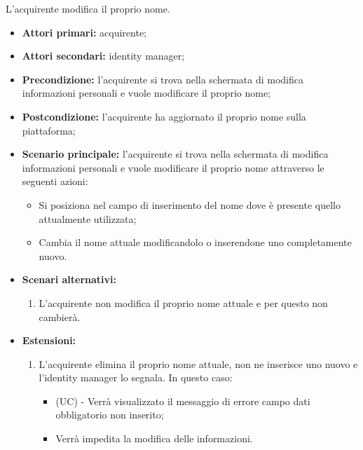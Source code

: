 L'acquirente modifica il proprio nome.
\begin{itemize}
    \item \textbf{Attori primari:} acquirente;
    \item \textbf{Attori secondari:} identity manager;
    \item \textbf{Precondizione:} l'acquirente si trova nella schermata di modifica informazioni personali e vuole modificare il proprio nome;
    \item \textbf{Postcondizione:} l'acquirente ha aggiornato il proprio nome sulla piattaforma;
    \item \textbf{Scenario principale:} l'acquirente si trova nella schermata di modifica informazioni personali e vuole modificare il proprio nome attraverso le seguenti azioni:
        \begin{itemize}
            \item Si posiziona nel campo di inserimento del nome dove è presente quello attualmente utilizzata;
            \item Cambia il nome attuale modificandolo o inserendone uno completamente nuovo.
        \end{itemize}
    \item \textbf{Scenari alternativi:} 
    \begin{enumerate}[label=\lett]
        \item L'acquirente non modifica il proprio nome attuale e per questo non cambierà.
    \end{enumerate}
    \item \textbf{Estensioni:} 
    \begin{enumerate}[label=\lett]
        \item L'acquirente elimina il proprio nome attuale, non ne inserisce uno nuovo e l'identity manager lo segnala. In questo caso:
        \begin{itemize}
            \item (UC) - Verrà visualizzato il messaggio di errore campo dati obbligatorio non inserito;
            \item Verrà impedita la modifica delle informazioni.
        \end{itemize}
    \end{enumerate}
\end{itemize}

